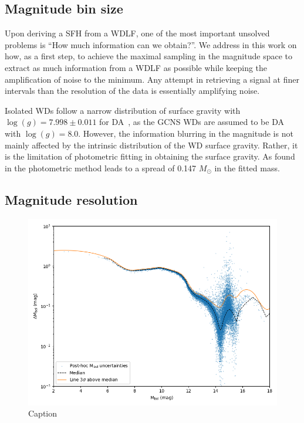 \documentclass[fleqn,usenatbib]{mnras}
\begin{document}
\subsection{Magnitude bin size}
\label{sec:magnitude_bin_size}
Upon deriving a SFH from a WDLF, one of the most important unsolved problems
is ``How much information can we obtain?''. We address in this work on
how, as a first step, to achieve the maximal sampling in the magnitude
space to extract as much information from a WDLF as possible while keeping
the amplification of noise to the minimum. Any attempt in retrieving a signal
at finer intervals than the resolution of the data is essentially amplifying
noise.

Isolated WDs follow a narrow distribution of surface gravity with
$\log(g)=7.998 \pm 0.011$ for DA~\citep{2021MNRAS.507.4646K}, as the GCNS
WDs are assumed to be DA with $\log(g) = 8.0$. However, the information
blurring in the magnitude is not mainly affected by the intrinsic
distribution of the WD surface gravity. Rather, it is the limitation of
photometric fitting in obtaining the surface gravity. As found in 
\citet{2019ApJ...871..169G} the photometric method leads to a spread of
0.147 $M_\odot$ in the fitted mass. 


\subsection{Magnitude resolution}
\begin{figure}
    \includegraphics[width=\columnwidth]{figures/fig_03_mbol_sigma.png}
    \caption{Caption}
    \label{fig:mbol_sigma}
\end{figure}
\end{document}
